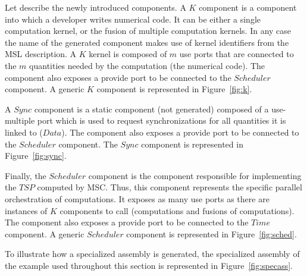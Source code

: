 Let describe the newly introduced components. A $K$ component is a component into which a developer writes numerical code. It can be either a single computation kernel, or the fusion of multiple computation kernels. In any case the name of the generated component makes use of kernel identifiers from the MSL description. A $K$ kernel is composed of $m$ use ports that are connected to the $m$ quantities needed by the computation (\ie the numerical code). The component also exposes a provide port to be connected to the $Scheduler$ component. A generic $K$ component is represented in Figure~\ref{fig:k}.

A $Sync$ component is a static component (not generated) composed of a use-multiple port which is used to request synchronizations for all quantities it is linked to ($Data$). The component also exposes a provide port to be connected to the $Scheduler$ component. The $Sync$ component is represented in Figure~\ref{fig:sync}.

Finally, the $Scheduler$ component is the component responsible for implementing the $TSP$ computed by MSC. Thus, this component represents the specific parallel orchestration of  computations. It exposes as many use ports as there are instances of $K$ components to call (\ie computations and fusions of computations). The component also exposes a provide port to be connected to the $Time$ component. A generic $Scheduler$ component is represented in Figure~\ref{fig:sched}.

To illustrate how a specialized assembly is generated, the specialized assembly of the example used throughout this section is represented in Figure~\ref{fig:specass}. 

